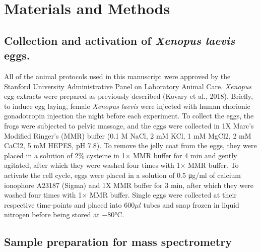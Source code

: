 \section{Materials and Methods} \label{Materials and Methods}

\subsection{Collection and activation of \emph{Xenopus laevis} eggs.}

All of the animal protocols used in this manuscript were approved by the Stanford University Administrative Panel on Laboratory Animal Care. \emph{Xenopus} egg extracts were prepared as previously described (Kovary et al., 2018), Briefly, to induce egg laying, female \emph{Xenopus laevis} were injected with human chorionic gonadotropin injection the night before each experiment. To collect the eggs, the frogs were subjected to pelvic massage, and the eggs were collected in 1X Marc’s Modified Ringer’s (MMR) buffer (0.1 M NaCl, 2 mM KCl, 1 mM MgCl2, 2 mM CaCl2, 5 mM HEPES, pH 7.8). To remove the jelly coat from the eggs, they were placed in a solution of 2\% cysteine in 1× MMR buffer for 4 min and gently agitated, after which they were washed four times with 1× MMR buffer. To activate the cell cycle, eggs were placed in a solution of 0.5 μg/ml of calcium ionophore A23187 (Sigma) and 1X MMR buffer for 3 min, after which they were washed four times with 1× MMR buffer. Single eggs were collected at their respective time-points and placed into 600$\mu l$ tubes and snap frozen in liquid nitrogen before being stored at $-80$\si{\degree}C.

\subsection{Sample preparation for mass spectrometry}

